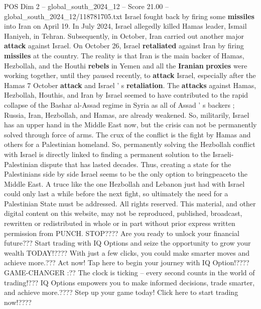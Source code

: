 \begin{textsample}{POS Dim 2 – global\_south\_2024\_12 – Score 21.00 – global\_south\_2024\_12/118781705.txt}
Israel fought back by firing some \textbf{missiles} into Iran on April 19.
In July 2024, Israel allegedly killed Hamas leader, Ismail Haniyeh, in Tehran.
Subsequently, in October, Iran carried out another major \textbf{attack} against Israel.
On October 26, Israel \textbf{retaliated} against Iran by firing \textbf{missiles} at the country.
The reality is that Iran is the main backer of Hamas, Hezbollah, and the Houthi \textbf{rebels} in Yemen and all the \textbf{Iranian} \textbf{proxies} were working together, until they paused recently, to \textbf{attack} Israel, especially after the Hamas 7 October \textbf{attack} and Israel ' s \textbf{retaliation}.
The \textbf{attacks} against Hamas, Hezbollah, Houthis, and Iran by Israel seemed to have contributed to the rapid collapse of the Bashar al-Assad regime in Syria as all of Assad ' s backers ; Russia, Iran, Hezbollah, and Hamas, are already weakened.
So, militarily, Israel has an upper hand in the Middle East now, but the crisis can not be permanently solved through force of arms.
The crux of the conflict is the fight by Hamas and others for a Palestinian homeland.
So, permanently solving the Hezbollah conflict with Israel is directly linked to finding a permanent solution to the Israeli-Palestinian dispute that has lasted decades.
Thus, creating a state for the Palestinians side by side Israel seems to be the only option to bringpeaceto the Middle East.
A truce like the one Hezbollah and Lebanon just had with Israel could only last a while before the next fight, so ultimately the need for a Palestinian State must be addressed.
All rights reserved.
This material, and other digital content on this website, may not be reproduced, published, broadcast, rewritten or redistributed in whole or in part without prior express written permission from PUNCH.
STOP????
Are you ready to unlock your financial future???
Start trading with IQ Options and seize the opportunity to grow your wealth TODAY!????
With just a few clicks, you could make smarter moves and achieve more.???
Act now!
Tap here to begin your journey with IQ Option!????
GAME-CHANGER :??
The clock is ticking -- every second counts in the world of trading!???
IQ Options empowers you to make informed decisions, trade smarter, and achieve more.????
Step up your game today!
Click here to start trading now!????

\end{textsample}
